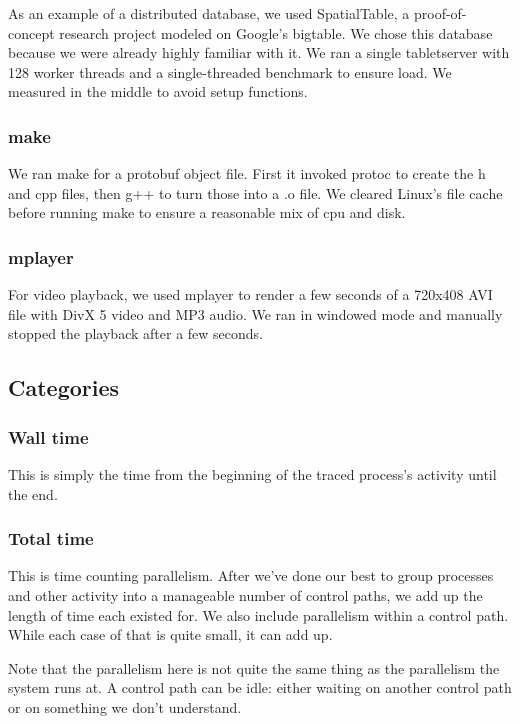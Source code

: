\documentclass[10pt]{article}
\begin{document}
As an example of a distributed database, we used SpatialTable\cite{spatialtable}, a proof-of-concept research project modeled on Google's bigtable\cite{bigtable}.  We chose this database because we were already highly familiar with it.  We ran a single tabletserver with 128 worker threads and a single-threaded benchmark to ensure load.  We measured in the middle to avoid setup functions.

\subsubsection{make}

We ran make for a protobuf object file.  First it invoked protoc to create the h and cpp files, then g++ to turn those into a .o file.  We cleared Linux's file cache before running make to ensure a reasonable mix of cpu and disk.

\subsubsection{mplayer}

For video playback, we used mplayer to render a few seconds of a 720x408 AVI file with DivX 5 video and MP3 audio.  We ran in windowed mode and manually stopped the playback after a few seconds.

\subsection{Categories}

\subsubsection{Wall time}

This is simply the time from the beginning of the traced process's activity until the end.

\subsubsection{Total time}

This is time counting parallelism.  After we've done our best to group processes and other activity into a manageable number of control paths, we add up the length of time each existed for.  We also include parallelism within a control path.  While each case of that is quite small, it can add up.

Note that the parallelism here is not quite the same thing as the parallelism the system runs at.  A control path can be idle: either waiting on another control path or on something we don't understand.
\end{document}
